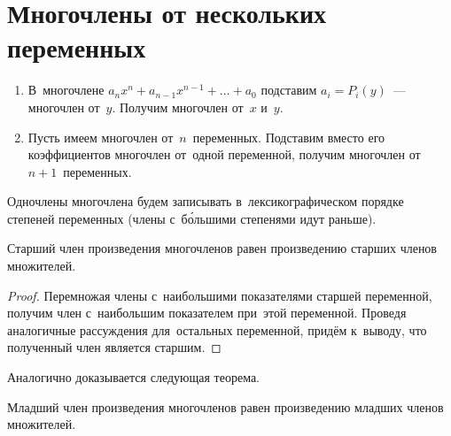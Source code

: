 \section{Многочлены от нескольких переменных}
\begin{enumerate}
	\item В~многочлене $a_n x^n + a_{n-1} x^{n-1} + \ldots + a_0$ подставим $a_i = P_i(y)$~--- многочлен от~$y$.
	Получим многочлен от~$x$ и~$y$.
	
	\item Пусть имеем многочлен от~$n$~переменных.
	Подставим вместо его коэффициентов многочлен от~одной переменной, получим многочлен от~$n + 1$~переменных.
\end{enumerate}

Одночлены многочлена будем записывать в~лексикографическом порядке степеней переменных (члены с~б\'{о}льшими степенями идут раньше).

\begin{theorem}
Старший член произведения многочленов равен произведению старших членов множителей.
\end{theorem}
\begin{proof}
Перемножая члены с~наибольшими показателями старшей переменной, получим член с~наибольшим показателем при~этой переменной.
Проведя аналогичные рассуждения для~остальных переменной, придём к~выводу, что полученный член является старшим.
\end{proof}

Аналогично доказывается следующая теорема.
\begin{theorem}
Младший член произведения многочленов равен произведению младших членов множителей.
\end{theorem}


